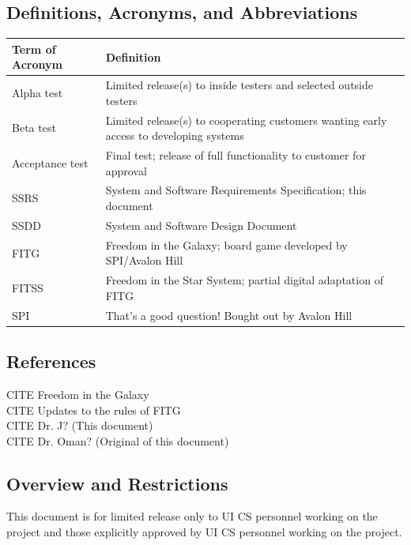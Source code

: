 \documentclass[twoside,letterpaper]{article}
\begin{document}
\subsection{Definitions, Acronyms, and Abbreviations}

\begin{minipage}{\linewidth}
\centering
\begin{tabularx}{\textwidth}{lX}\toprule[1.5pt] %

\bf Term of Acronym & \bf Definition\\ \midrule[1.0pt]

Alpha test & Limited release(s) to inside testers and selected outside testers\\
Beta test & Limited release(s) to cooperating customers wanting early access to developing systems\\
Acceptance test & Final test; release of full functionality to customer for approval\\
SSRS & System and Software Requirements Specification; this document\\
SSDD & System and Software Design Document\\
FITG & Freedom in the Galaxy; board game developed by SPI/Avalon Hill\\
FITSS & Freedom in the Star System; partial digital adaptation of FITG\\
SPI & That's a good question! Bought out by Avalon Hill\\

\bottomrule[1.5pt]
\end{tabularx}
\end{minipage}


\subsection{References}
CITE Freedom in the Galaxy \\
CITE Updates to the rules of FITG \\
CITE Dr. J? (This document)\\
CITE Dr. Oman? (Original of this document)

\subsection{Overview and Restrictions}
This document is for limited release only to UI CS personnel working on
the project and those explicitly approved by UI CS personnel working on the project.
\end{document}
